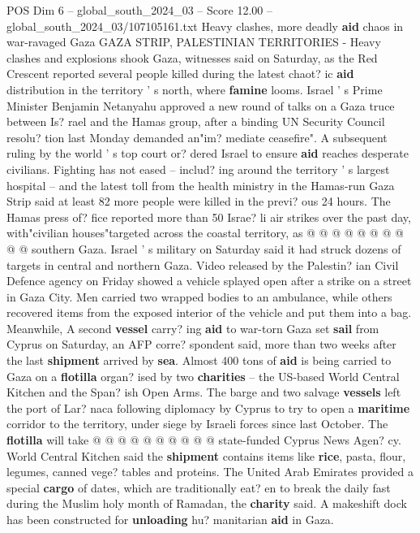 \begin{textsample}{POS Dim 6 – global\_south\_2024\_03 – Score 12.00 – global\_south\_2024\_03/107105161.txt}  \label{ex:f6_pos_036}
Heavy clashes, more deadly \textbf{aid} chaos in war-ravaged Gaza GAZA STRIP, PALESTINIAN TERRITORIES - Heavy clashes and explosions shook Gaza, witnesses said on Saturday, as the Red Crescent reported several people killed during the latest chaot? ic \textbf{aid} distribution in the territory ' s north, where \textbf{famine} looms.
Israel ' s Prime Minister Benjamin Netanyahu approved a new round of talks on a Gaza truce between Is? rael and the Hamas group, after a binding UN Security Council resolu? tion last Monday demanded an"im? mediate ceasefire".
A subsequent ruling by the world ' s top court or? dered Israel to ensure \textbf{aid} reaches desperate civilians.
Fighting has not eased -- includ? ing around the territory ' s largest hospital -- and the latest toll from the health ministry in the Hamas-run Gaza Strip said at least 82 more people were killed in the previ? ous 24 hours.
The Hamas press of? fice reported more than 50 Israe? li air strikes over the past day, with"civilian houses"targeted across the coastal territory, as @ @ @ @ @ @ @ @ @ @ southern Gaza.
Israel ' s military on Saturday said it had struck dozens of targets in central and northern Gaza.
Video released by the Palestin? ian Civil Defence agency on Friday showed a vehicle splayed open after a strike on a street in Gaza City.
Men carried two wrapped bodies to an ambulance, while others recovered items from the exposed interior of the vehicle and put them into a bag.
Meanwhile, A second \textbf{vessel} carry? ing \textbf{aid} to war-torn Gaza set \textbf{sail} from Cyprus on Saturday, an AFP corre? spondent said, more than two weeks after the last \textbf{shipment} arrived by \textbf{sea}.
Almost 400 tons of \textbf{aid} is being carried to Gaza on a \textbf{flotilla} organ? ised by two \textbf{charities} -- the US-based World Central Kitchen and the Span? ish Open Arms.
The barge and two salvage \textbf{vessels} left the port of Lar? naca following diplomacy by Cyprus to try to open a \textbf{maritime} corridor to the territory, under siege by Israeli forces since last October.
The \textbf{flotilla} will take @ @ @ @ @ @ @ @ @ @ state-funded Cyprus News Agen? cy.
World Central Kitchen said the \textbf{shipment} contains items like \textbf{rice}, pasta, flour, legumes, canned vege? tables and proteins.
The United Arab Emirates provided a special \textbf{cargo} of dates, which are traditionally eat? en to break the daily fast during the Muslim holy month of Ramadan, the \textbf{charity} said.
A makeshift dock has been constructed for \textbf{unloading} hu? manitarian \textbf{aid} in Gaza.

\end{textsample}
